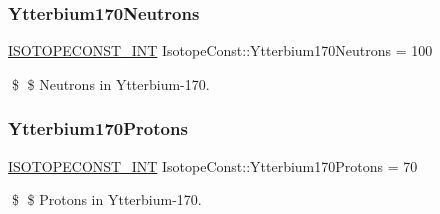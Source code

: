 \subsubsection{\texorpdfstring{Ytterbium170\+Neutrons}{Ytterbium170Neutrons}}
{\footnotesize\ttfamily \mbox{\hyperlink{group___isotope_const-_macros_ga5f18360b3e99483a35c32d789e62621c}{I\+S\+O\+T\+O\+P\+E\+C\+O\+N\+S\+T\+\_\+\+I\+NT}} Isotope\+Const\+::\+Ytterbium170\+Neutrons = 100}

\$ \$ Neutrons in Ytterbium-\/170. \mbox{\label{group___isotope_const-_ytterbium-_yb170_ga81d65233327e255ef225dc999827e4f9}} 
\subsubsection{\texorpdfstring{Ytterbium170\+Protons}{Ytterbium170Protons}}
{\footnotesize\ttfamily \mbox{\hyperlink{group___isotope_const-_macros_ga5f18360b3e99483a35c32d789e62621c}{I\+S\+O\+T\+O\+P\+E\+C\+O\+N\+S\+T\+\_\+\+I\+NT}} Isotope\+Const\+::\+Ytterbium170\+Protons = 70}

\$ \$ Protons in Ytterbium-\/170. 